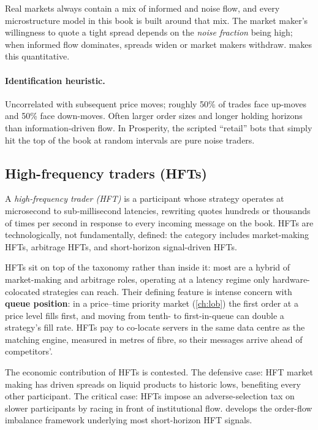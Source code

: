 Real markets always contain a mix of informed and noise flow, and
every microstructure model in this book is built around that mix. The
market maker's willingness to quote a tight spread depends on the
\emph{noise fraction} being high; when informed flow dominates,
spreads widen or market makers withdraw.  makes
this quantitative.

\paragraph{Identification heuristic.} Uncorrelated with subsequent
price moves; roughly 50\% of trades face up-moves and 50\% face
down-moves. Often larger order sizes and longer holding horizons than
information-driven flow. In Prosperity, the scripted ``retail'' bots
that simply hit the top of the book at random intervals are pure
noise traders.

\subsection{High-frequency traders (HFTs)}
\label{subsec:hft}

\begin{definition}
A \emph{high-frequency trader (HFT)} is a participant whose strategy
operates at microsecond to sub-millisecond latencies, rewriting quotes
hundreds or thousands of times per second in response to every incoming
message on the book. HFTs are technologically, not fundamentally,
defined: the category includes market-making HFTs, arbitrage HFTs, and
short-horizon signal-driven HFTs.
\end{definition}

HFTs sit on top of the taxonomy rather than inside it: most are a
hybrid of market-making and arbitrage roles, operating at a latency
regime only hardware-colocated strategies can reach. Their defining
feature is intense concern with \textbf{queue position}: in a
price--time priority market (\cref{ch:lob}) the first order at a price
level fills first, and moving from tenth- to first-in-queue can double
a strategy's fill rate. HFTs pay to co-locate servers in the same data
centre as the matching engine, measured in metres of fibre, so their
messages arrive ahead of competitors'.

The economic contribution of HFTs is contested. The defensive case:
HFT market making has driven spreads on liquid products to historic
lows, benefiting every other participant. The critical case: HFTs
impose an adverse-selection tax on slower participants by racing in
front of institutional flow.  develops the
order-flow imbalance framework underlying most short-horizon HFT
signals.

